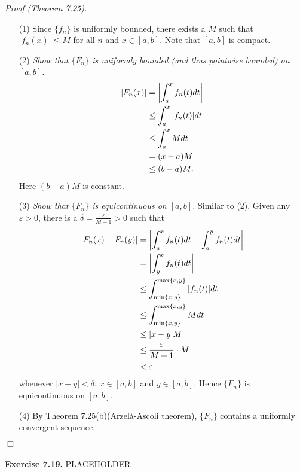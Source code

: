 \documentclass{article}
\begin{document}
\emph{Proof (Theorem 7.25).}
\begin{enumerate}
\item[(1)]
  Since $\{f_n\}$ is uniformly bounded,
  there exists a $M$ such that $|f_n(x)| \leq M$ for all $n$ and $x \in [a,b]$.
  Note that $[a,b]$ is compact.

\item[(2)]
  \emph{Show that $\{F_n\}$ is uniformly bounded
  (and thus pointwise bounded) on $[a,b]$.}
  \begin{align*}
    \abs{F_n(x)}
    &= \abs{ \int_{a}^{x} f_n(t)dt } \\
    &\leq \int_{a}^{x} \abs{f_n(t)}dt \\
    &\leq \int_{a}^{x} M dt \\
    &= (x-a)M \\
    &\leq (b-a)M.
  \end{align*}
  Here $(b-a)M$ is constant.

\item[(3)]
  \emph{Show that $\{F_n\}$ is equicontinuous on $[a,b]$.}
  Similar to (2).
  Given any $\varepsilon > 0$,
  there is a $\delta = \frac{\varepsilon}{M+1} > 0$ such that
  \begin{align*}
    \abs{F_n(x)-F_n(y)}
    &= \abs{ \int_{a}^{x} f_n(t)dt - \int_{a}^{y} f_n(t)dt } \\
    &= \abs{ \int_{y}^{x} f_n(t)dt } \\
    &\leq \int_{\min\{x,y\}}^{\max\{x,y\}} \abs{f_n(t)}dt \\
    &\leq \int_{\min\{x,y\}}^{\max\{x,y\}} M dt \\
    &\leq |x-y|M \\
    &\leq \frac{\varepsilon}{M+1} \cdot M \\
    &< \varepsilon
  \end{align*}
  whenever $|x-y| < \delta$, $x \in [a,b]$ and $y \in [a,b]$.
  Hence $\{F_n\}$ is equicontinuous on $[a,b]$.

\item[(4)]
  By Theorem 7.25(b)(Arzel\`{a}-Ascoli theorem),
  $\{F_n\}$ contains a uniformly convergent sequence.
\end{enumerate}
$\Box$ \\\\






\textbf{Exercise 7.19.}
PLACEHOLDER \\\\
\end{document}
